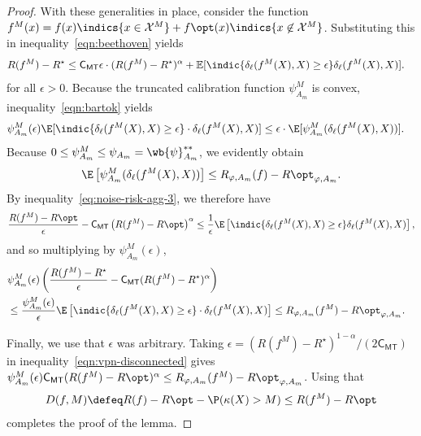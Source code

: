 \documentclass[11pt]{article}
\newcommand{\constant}{\mathsf{C}}  %
\newcommand{\cstMT}{\constant_{\mathsf{MT}}}
\newcommand{\sX}{\mathcal{X}} %
\newcommand{\tloss}{\ell}  %
\newcommand{\sloss}{\varphi}  %
\newcommand{\extloss}{\delta_\tloss}
\begin{document}
\begin{proof}
  With these generalities in place, consider the function $f^M(x) = f(x)
  \indics{x \in \sX^M} + f\opt(x) \indics{x \not\in \sX^M}$.
  Substituting this in inequality~\eqref{eqn:beethoven} yields
  \begin{align}
    R(f^M) - R^\star
    & \leq \cstMT \epsilon \cdot (R(f^M)-R^\star)^\alpha +
    \mathbb{E}[\indic{\extloss(f^M(X),X) \geq \epsilon} \extloss(f^M(X),X)] .
    \label{eq:noise-risk-agg-3}
  \end{align}
  for all $\epsilon > 0$.
  Because the truncated calibration function $\psi_{A_m}^M$
  is convex,
  inequality~\eqref{eqn:bartok} yields
  \begin{align*}
    \psi_{A_m}^M(\epsilon)
    \E[\indic{\extloss(f^M(X),X) \geq \epsilon}
      \cdot \extloss(f^M(X),X)]
    & \leq \epsilon \cdot \E[\psi_{A_m}^M(\extloss(f^M(X),X))].
  \end{align*}
  Because $0 \le \psi_{A_m}^M \le \psi_{A_m}
  = \wb{\psi}_{A_m}^{**}$,
  we evidently obtain
  \begin{equation*}
    \E\left[\psi_{A_m}^M(\extloss(f^M(X), X))\right]
    \le R_{\sloss,A_m}(f) - R\opt_{\sloss,A_m}.
  \end{equation*}
  By inequality~\eqref{eq:noise-risk-agg-3},
  we therefore have
  \begin{equation*}
    \frac{R(f^M) - R\opt}{\epsilon}
    - \cstMT \left(R(f^M) - R\opt\right)^\alpha
    \le \frac{1}{\epsilon}
    \E\left[\indic{\extloss(f^M(X), X) \ge \epsilon}
      \extloss(f^M(X), X)\right],
  \end{equation*}
  and so multiplying by $\psi_{A_m}^M(\epsilon)$,
  \begin{align}
    \lefteqn{\psi_{A_m}^M(\epsilon)
      \left(\frac{R(f^M) - R^\star}{\epsilon} - \cstMT(R(f^M)-R^\star)^\alpha
      \right)} \nonumber \\
    & \le \frac{\psi_{A_m}^M(\epsilon)}{\epsilon}
    \E\left[\indic{\extloss(f^M(X),X) \geq \epsilon}
      \cdot \extloss(f^M(X),X)\right]
    \le R_{\sloss,A_m}(f^M) - R\opt_{\sloss, A_m}.
    \label{eqn:vpn-disconnected}
  \end{align}
  
  Finally, we use that $\epsilon$ was arbitrary.
  Taking $\epsilon = (R(f^M)-R^\star)^{1-\alpha}/(2\cstMT)$
  in inequality~\eqref{eqn:vpn-disconnected}
  gives
  $\psi_{A_m}^M(\epsilon)
  \cstMT (R(f^M) - R\opt)^\alpha \le
  R_{\sloss,A_m}(f^M) - R\opt_{\sloss,A_m}$.
  Using that
  \begin{equation*}
    D(f, M) \defeq R(f) - R\opt - \P(\kappa(X) > M)
    \le R(f^M) - R\opt
  \end{equation*}
  completes the proof of the lemma.
\end{proof}
\end{document}
